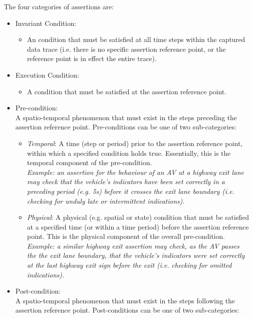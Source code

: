 The four categories of assertions are:
\begin{itemize}
    \item Invariant Condition:
    \begin{itemize}
        \item An condition that must be satisfied at all time steps within the captured data trace (i.e. there is no specific assertion reference point, or the reference point is in effect the entire trace).
    \end{itemize}
     \item Execution Condition:
    \begin{itemize}
        \item A condition that must be satisfied at the assertion reference point.
    \end{itemize}
    \item Pre-condition: \\
    A spatio-temporal phenomenon that must exist in the steps preceding the assertion reference point. Pre-conditions can be one of two sub-categories:
    \begin{itemize}
        \item \textit{Temporal}: A time (step or period) prior to the assertion reference point, within which a specified condition holds true. Essentially, this is the temporal component of the pre-condition.\\
        \textit{Example: an assertion for the behaviour of an AV at a highway exit lane may check that the vehicle's indicators have been set correctly in a preceding period (e.g. 5s) before it crosses the exit lane boundary (i.e. checking for unduly late or intermittent indications).}
        \item \textit{Physical}: A physical (e.g. spatial or state) condition that must be satisfied at a specified time (or within a  time period) before the assertion reference point. This is the physical component of the overall pre-condition.\\
        \textit{Example: a similar highway exit assertion may check, as the AV passes the the exit lane boundary, that the vehicle's indicators were set correctly at the last highway exit sign before the exit (i.e. checking for omitted indications).}
    \end{itemize}
    \item Post-condition: \\
    A spatio-temporal phenomenon that must exist in the steps following the assertion reference point. Post-conditions can be one of two sub-categories:

\end{itemize}
